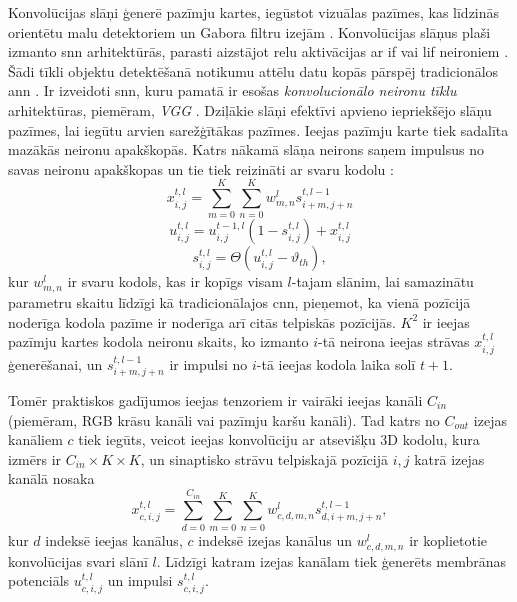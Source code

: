Konvolūcijas slāņi ģenerē pazīmju kartes, iegūstot vizuālas pazīmes, kas līdzinās orientētu malu detektoriem un Gabora filtru
izejām \cite{tavanaei2019}. Konvolūcijas slāņus plaši izmanto \Gls{snn} arhitektūrās, parasti aizstājot \Gls{relu}
aktivācijas ar \Gls{if} vai \Gls{lif} neironiem \cite{cao2015}. Šādi tīkli objektu detektēšanā notikumu attēlu datu kopās
pārspēj tradicionālos \Gls{ann} \cite{zhang2023}. Ir izveidoti \Gls{snn}, kuru pamatā ir esošas \textit{konvolucionālo
neironu tīklu}  arhitektūras,
piemēram, \textit{VGG} \cite{na2022}. Dziļākie slāņi efektīvi apvieno iepriekšējo slāņu pazīmes, lai iegūtu arvien
sarežģītākas pazīmes. Ieejas pazīmju karte tiek sadalīta mazākās neironu apakškopās. Katrs nākamā slāņa neirons saņem
impulsus no savas neironu apakškopas un tie tiek reizināti ar svaru kodolu \cite{tavanaei2017}:
\begin{equation}
  x^{t,l}_{i,j} = \sum^{K}_{m=0} \sum^{K}_{n=0} w^l_{m,n} s^{t,l-1}_{i+m,j+n}
  \label{eq:lif_conv}
\end{equation}
\begin{equation}
  {u}^{t,l}_{i,j} = u^{t-1,l}_{i,j}(1 - s^{t,l}_{i,j}) + x^{t,l}_{i,j}
  \label{eq:lif_v}
\end{equation}
\begin{equation}
  s^{t,l}_{i,j} = \Theta ({u}^{t,l}_{i,j} - \vartheta_{th}),
  \label{eq:lif_spike}
\end{equation}
kur \(w^l_{m,n}\) ir svaru kodols, kas ir kopīgs visam \(l\)-tajam slānim, lai samazinātu parametru skaitu līdzīgi kā tradicionālajos \Gls{cnn}, pieņemot, ka vienā pozīcijā noderīga kodola pazīme ir noderīga arī citās telpiskās pozīcijās. \(K^2\) ir ieejas pazīmju kartes kodola neironu skaits, ko izmanto \(i\)-tā neirona ieejas strāvas \(x^{t,l}_{i,j}\) ģenerēšanai, un \(s^{t,l-1}_{i+m,j+n}\) ir impulsi no \(i\)-tā ieejas kodola laika solī \(t+1\).

Tomēr praktiskos gadījumos ieejas tenzoriem ir vairāki ieejas kanāli \(C_{in}\) (piemēram, RGB krāsu kanāli vai pazīmju karšu kanāli). Tad katrs no \(C_{out}\) izejas kanāliem \(c\) tiek iegūts, veicot ieejas konvolūciju ar atsevišķu 3D kodolu, kura izmērs ir \(C_{in} \times K \times K\), un sinaptisko strāvu telpiskajā pozīcijā \(i,j\) katrā izejas kanālā nosaka
\begin{equation}
    x^{t,l}_{c,i,j} = \sum^{C_{in}}_{d=0} \sum^{K}_{m=0} \sum^{K}_{n=0} w^l_{c,d,m,n} s^{t,l-1}_{d,i+m,j+n},
    \label{eq:channel_conv}
\end{equation}
kur \(d\) indeksē ieejas kanālus, \(c\) indeksē izejas kanālus un \(w^l_{c,d,m,n}\) ir koplietotie konvolūcijas svari slānī \(l\). Līdzīgi katram izejas kanālam tiek ģenerēts membrānas potenciāls \({u}^{t,l}_{c,i,j}\) un impulsi \(s^{t,l}_{c,i,j}\).

